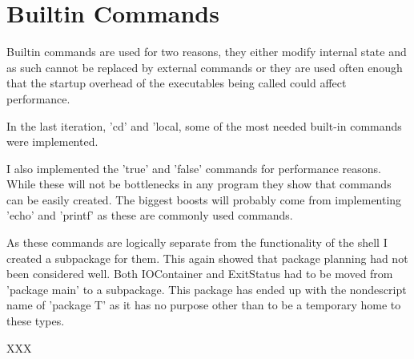 \section{Builtin Commands}
\label{sec:builtins}
Builtin commands are used for two reasons, they either modify internal state and as such cannot be replaced by external commands or they are used often enough that the startup overhead of the executables being called could affect performance.

In the last iteration, 'cd' and 'local, some of the most needed built-in commands were implemented.

I also implemented the 'true' and 'false' commands for performance reasons.
While these will not be bottlenecks in any program they show that commands can be easily created.
The biggest boosts will probably come from implementing 'echo' and 'printf' as these are commonly used commands.

As these commands are logically separate from the functionality of the shell I created a subpackage for them.
This again showed that package planning had not been considered well.
Both IOContainer and ExitStatus had to be moved from 'package main' to a subpackage.
This package has ended up with the nondescript name of 'package T' as it has no purpose other than to be a temporary home to these types.

XXX